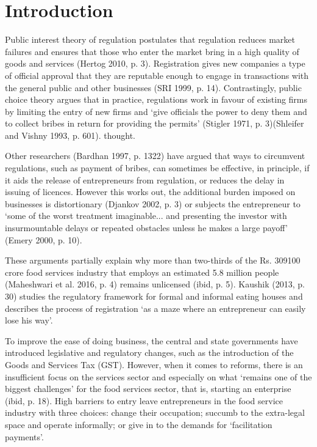 \documentclass[a4paper, 12pt]{article}
\begin{document}
                    \newpage
                    \section{Introduction}
                    \label{intro}
                    Public interest theory of regulation postulates that regulation reduces market failures and ensures that those who enter the market bring in a high quality of goods and services (Hertog 2010, p. 3). Registration gives new companies a type of official 
approval that they are reputable enough to engage in transactions with the general public and other businesses (SRI 1999, p. 14). Contrastingly, public choice theory argues that in practice, regulations work in favour of existing firms by limiting the entry of new firms 
and ‘give officials the power to deny them and to collect bribes in return for providing the permits’ (Stigler 1971, p. 3)(Shleifer and Vishny 1993, p. 601). %
thought. 
                    
                    Other researchers (Bardhan 1997, p. 1322) have argued that ways to circumvent regulations, such as payment of bribes, can sometimes be effective, in principle, if it aids the release of entrepreneurs from regulation, or reduces the delay in issuing of 
licences. However this works out, the additional burden imposed on businesses is distortionary (Djankov 2002, p. 3) or subjects the entrepreneur to ‘some of the worst treatment imaginable... and presenting the investor with insurmountable delays or repeated 
obstacles unless he makes a large payoff’ (Emery 2000, p. 10). 
                    
                    These arguments partially explain why more than two-thirds of the Rs. 309100 crore food services industry that employs an estimated 5.8 million people (Maheshwari et al. 2016, p. 4) remains unlicensed (ibid, p. 5). Kaushik (2013, p. 30) studies the 
regulatory framework for formal and informal eating houses and describes the process of registration ‘as a maze where an entrepreneur can easily lose his way’. 
                    
                    To improve the ease of doing business, the central and state governments have introduced legislative and regulatory changes, such as the introduction of the Goods and Services Tax (GST). However, when it comes to reforms, there is an insufficient 
focus on the services sector and especially on what ‘remains one of the biggest challenges’ for the food services sector, that is, starting an enterprise (ibid, p. 18). High barriers to entry leave entrepreneurs in the food service industry with three choices: change their 
occupation; succumb to the extra-legal space and operate informally; or give in to the demands for ‘facilitation payments’.
                    
\end{document}
